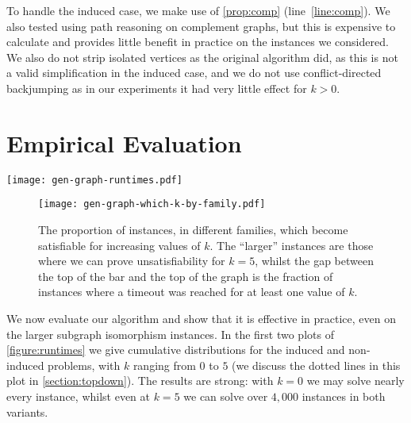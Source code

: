 \documentclass[letterpaper]{article}
\theoremstyle{definition}
\begin{document}
To handle the induced case, we make use of \cref{prop:comp} (line~\ref{line:comp}). We also tested
using path reasoning on complement graphs, but this is expensive to calculate and provides little
benefit in practice on the instances we considered.  We also do not strip isolated vertices as the
original algorithm did, as this is not a valid simplification in the induced case, and we do not use
conflict-directed backjumping as in our experiments it had very little effect for $k > 0$.

\section{Empirical Evaluation}\label{section:evaluation}

\begin{figure*}[tb]
    \centering
    \texttt{[image: gen-graph-runtimes.pdf]}
    \caption{In the first two plots we show the cumulative number of instances solved over time, for the
        induced and non-induced problems, with different values of $k$. We also show the results of
        iteratively increasing $k$ until a solution is found, and in the induced case, the
        performance of two leading maximum common subgraph algorithms. In the third plot we show results
        comparing iteratively increasing $k$ with our algorithm to other approaches on maximum
        common induced subgraph instances.}\label{figure:runtimes}
\end{figure*}

\begin{figure}[h!]
    \centering
    \texttt{[image: gen-graph-which-k-by-family.pdf]}
    \caption{The proportion of instances, in different families, which become satisfiable for
    increasing values of $k$. The ``larger'' instances are those where we can prove unsatisfiability for
    $k = 5$, whilst the gap between the top of the bar and the top of the graph is the fraction of
    instances where a timeout was reached for at least one value of $k$.}\label{figure:which-k}
\end{figure}

We now evaluate our algorithm and show that it is effective in practice, even on the larger subgraph
isomorphism instances. In the first two plots of \cref{figure:runtimes} we give cumulative
distributions for the induced and non-induced problems, with $k$ ranging from $0$ to $5$ (we discuss
the dotted lines in this plot in \cref{section:topdown}). The results are strong: with $k = 0$ we
may solve nearly every instance, whilst even at $k = 5$ we can solve over $4,000$ instances in both
variants.
\end{document}
